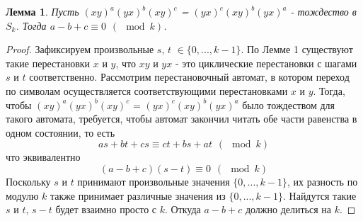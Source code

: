 \documentclass{article}
\newtheorem{lemma}{Лемма}
\begin{document}
	\begin{lemma}
		Пусть $(xy)^a(yx)^b(xy)^c$ = $(yx)^c(xy)^b(yx)^a$ - тождество в $S_k$. Тогда $a - b + c \equiv 0 \hspace{5pt} (\mod k)$.
	\end{lemma}
	\begin{proof}
		Зафиксируем произвольные $s$,  $t$ $\in \{0, ..., k-1\}$. По Лемме 1 существуют такие перестановки $x$ и $y$, что $xy$ и $yx$ - это циклические перестановки с шагами $s$ и $t$ соответственно. Рассмотрим перестановочный автомат, в котором переход по символам осуществляется соответствующими перестановками $x$ и $y$. Тогда, чтобы $(xy)^a(yx)^b(xy)^c$ = $(yx)^c(xy)^b(yx)^a$ было тождеством для такого автомата, требуется, чтобы автомат закончил читать обе части равенства в одном состоянии, то есть	
		\begin{equation}
			as + bt + cs \equiv ct + bs + at \hspace{5pt} (\mod k)
		\end{equation}
		что эквивалентно 
		\begin{equation}
		(a - b + c)(s - t) \equiv 0 \hspace{5pt} (\mod k)
		\end{equation}
		Поскольку $s$ и $t$ принимают произвольные значения $\{0, ..., k-1\}$, их разность по модулю $k$ также принимает различные значения из $\{0, ..., k-1\}$. Найдутся такие $s$ и $t$, $s-t$ будет взаимно просто с $k$. Откуда $a - b + c$ должно делиться на $k$.
	\end{proof}
\end{document}
